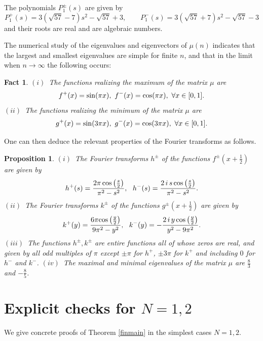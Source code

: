 \documentclass{amsart}
\newtheorem{prop}[thm]{Proposition}
\newtheorem{fact}[thm]{Fact}
\def\sin{{{\rm sin}}}
\def\cos{{{\rm cos}}}
\def\sin{{{\rm sin}}}
\def\cos{{{\rm cos}}}
\begin{document}
The polynomials $P_1^\pm(s)$ are given by 
$$
P_1^+(s)=3 \left(\sqrt{57}-7\right) s^2-\sqrt{57}+3, \qquad P_1^-(s)= 3 \left(\sqrt{57}+7\right) s^2-\sqrt{57}-3
$$
and their roots are real and are  algebraic numbers.\newline

The numerical study of the eigenvalues and eigenvectors of $\mu(n)$ indicates that the largest and smallest eigenvalues are simple for finite $n$, and that in the limit when $n\to \infty$ the following occurs:
\begin{fact} $(i)$~The functions realizing the maximum of the matrix $\mu$ are 
$$f^+(x)=\sin(\pi x), \ f^-(x)=\cos(\pi x), \ \forall x\in [0,1].$$
	$(ii)$~The functions realizing the minimum of the matrix $\mu$ are 
$$g^+(x)=\sin(3\pi x), \ g^-(x)=\cos(3\pi x), \ \forall x\in [0,1].$$
\end{fact}
One can then deduce the relevant properties of the Fourier transforms as follows. 
\begin{prop} $(i)$~The Fourier transforms $h^\pm$ of the functions $f^\pm(x+\frac 12)$ are given by 
$$
h^+(s)=\frac{2 \pi\,  \cos \left(\frac{s}{2}\right)}{\pi ^2-s^2}, \ \ h^-(s)=\frac{2\, i\, s \,\cos \left(\frac{s}{2}\right)}{\pi ^2-s^2}.
$$
$(ii)$~The Fourier transforms $k^\pm$ of the functions $g^\pm(x+\frac 12)$ are given by 
$$
k^+(y)=\frac{6 \pi  \cos \left(\frac{y}{2}\right)}{9 \pi ^2-y^2}, \ \ k^-(y)=-\frac{2 \,i \,y \,\cos \left(\frac{y}{2}\right)}{y^2-9 \pi ^2}.
$$
$(iii)$~The functions $h^\pm,k^\pm$ are entire functions all of whose zeros are real, and given by all odd multiples  of $\pi$ except $\pm \pi$ for $h^+$, $\pm 3\pi$ for $k^+$ and including $0$ for $h^-$ and $k^-$.	\newline
$(iv)$~The maximal and minimal eigenvalues of the matrix $\mu$ are $\frac 83$ and $-\frac 85$.
\end{prop}
\section{Explicit checks for $N=1,2$}
We  give concrete proofs of Theorem \ref{finmain} in the simplest cases $N=1,2$.
\end{document}
